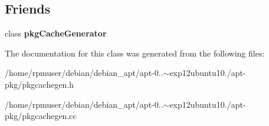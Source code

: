 \subsection*{\-Friends}
\begin{DoxyCompactItemize}
\item 
class {\bfseries pkg\-Cache\-Generator}\label{classpkgCacheGenerator_1_1ListParser_a6490b678234fceca3f2391d055076b60}

\end{DoxyCompactItemize}


\-The documentation for this class was generated from the following files\-:\begin{DoxyCompactItemize}
\item 
/home/rpmuser/debian/debian\-\_\-apt/apt-\/0..$\sim$exp12ubuntu10./apt-\/pkg/pkgcachegen.\-h\item 
/home/rpmuser/debian/debian\-\_\-apt/apt-\/0..$\sim$exp12ubuntu10./apt-\/pkg/pkgcachegen.\-cc\end{DoxyCompactItemize}
